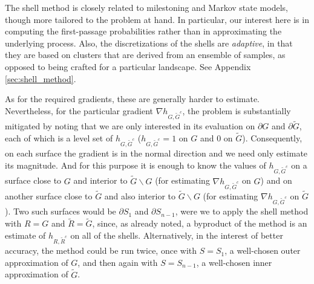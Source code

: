 \documentclass[12pt, nofootinbib,english, amsmath, amssymb, aps, priprint, graphicx,floatfix]{revtex4-1}
\theoremstyle{plain}
\theoremstyle{definition}
\theoremstyle{plain}
\begin{document}
The shell method is closely related to milestoning\cite{West2007-cn, Bello-Rivas2015-ld, Aristoff2016-gc} and Markov state models\cite{Pande2010-yi, Chodera2014-bh, Husic2018-xp}, though more tailored to the problem at hand. In particular, our interest here is in computing the first-passage probabilities rather than in approximating the underlying process. Also, the discretizations of the shells are {\em adaptive}, in that they are based on clusters that are derived from an ensemble of samples, as opposed to being crafted for a particular landscape.  See Appendix \ref{sec:shell_method}.
 
As for the required gradients, these are generally harder to estimate. Nevertheless, for the particular gradient $\nabla h_{G, \tilde{G}^c}$, the problem is substantially mitigated by noting that we are only interested in its evaluation on $\partial G$ and $\partial\tilde G$, each of which is a level set of 
$h_{G, \tilde{G}^c}$ ($h_{G, \tilde{G}^c}=1$ on $G$ and 0 on $\tilde G$). Consequently, on each surface the gradient is in the normal direction and we need only estimate its magnitude. And for this purpose it is enough to know the values of $h_{G, \tilde{G}^c}$ on a surface close to $G$ and interior to $\tilde{G}\backslash G$ (for estimating $\nabla h_{G, \tilde{G}^c}$ on $G$) and on another surface  
close to $\tilde{G}$ and also interior to $\tilde{G}\backslash G$ (for estimating $\nabla h_{G, \tilde{G}^c}$ on $\tilde G$). Two such surfaces would be $\partial S_1$ and $\partial S_{n-1}$, were we to apply the shell method with $R=G$ and $\tilde{R}=\tilde{G}$,
since, as already noted, a byproduct of the method is an estimate of 
$h_{R,\tilde{R}^c}$ on all of the shells. Alternatively, in the interest of better accuracy, the method could be run twice, once with $S=S_1$, a well-chosen outer approximation of $G$, and then again with 
$S=S_{n-1}$, a well-chosen inner approximation of $\tilde G$. 

\end{document}
